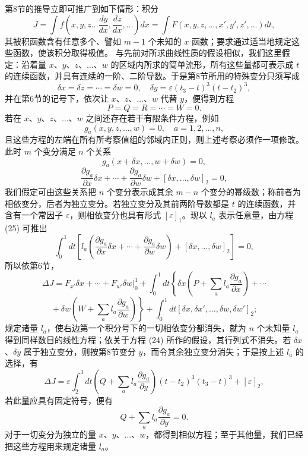 \documentclass[11pt,a4paper,leqno]{article}
\begin{document}
第8节的推导立即可推广到如下情形：积分
\[
J=\int f\left(x,y,z\ldots \frac{dy}{dx},\frac{dz}{dx},\ldots\right)dx=\int F(x,y,z,\ldots,x',y',z',\ldots)dt,
\]
其被积函数含有任意多个、譬如 $m-1$ 个未知的 $x$ 函数；要求通过适当地规定这些函数，使该积分取得极值。
与先前对所求曲线性质的假设相似，我们这里假定：沿着量 $x$、$y$、$z$、$\ldots$、$w$ 的区域内所求的简单流形，所有这些量都可表示成 $t$ 的连续函数，并具有连续的一阶、二阶导数。于是第8节所用的特殊变分只须写成
\[
\delta x=\delta z=\cdots=\delta w=0,\quad \delta y=\varepsilon(t_3-t)^3(t-t_2)^3,
\]
并在第6节的记号下，依次让 $x$、$z$、$\ldots$、$w$ 代替 $y$，便得到方程
\[
P=Q=R=\cdots=W=0.
\]
若在 $x$、$y$、$z$、$\ldots$、$w$ 之间还存在若干有限条件方程，例如
\begin{equation}\tag{24}
g_a(x,y,z,\ldots,w)=0,\quad a=1,2,\ldots,n,
\end{equation}
且这些方程的左端在所有所考察值组的邻域内正则，则上述考察必须作一项修改。此时 $m$ 个变分满足 $n$ 个关系
\[
g_a(x+\delta x,\ldots,w+\delta w)=0,
\]
\begin{equation}\tag{25}
\frac{\partial g_a}{\partial x}\delta x+\cdots+\frac{\partial g_a}{\partial w}\delta w+[\delta x,\ldots,\delta w]_2=0,
\end{equation}
我们假定可由这些关系把 $n$ 个变分表示成其余 $m-n$ 个变分的幂级数；称前者为相依变分，后者为独立变分。若独立变分及其前两阶导数都是 $t$ 的连续函数，并含有一个常因子 $\varepsilon$，则相依变分也具有形式 $[\varepsilon]_1$。现以 $l_a$ 表示任意量，由方程 (25) 可推出
\[
\int_0^1 dt\left[l_a\left(\frac{\partial g_a}{\partial x}\delta x+\cdots+\frac{\partial g_a}{\partial w}\delta w\right)+[\delta x,\ldots,\delta w]_2\right]=0,
\]
所以依第6节，
\[
\Delta J=\left. F_{x'}\delta x+\cdots+F_{w'}\delta w\right|_0^1+\int_0^1dt\left\{\delta x\left(P+\sum_a l_a\frac{\partial g_a}{\partial x}\right)+\cdots
\right.
\]
\[
\left.{}+\delta w\left(W+\sum_a l_a\frac{\partial g_a}{\partial w}\right)\right\}+\int_0^1dt[\delta x,\delta x',\ldots,\delta w,\delta w']_2;
\]
规定诸量 $l_a$，使右边第一个积分号下的一切相依变分都消失，就为 $n$ 个未知量 $l_a$ 得到同样数目的线性方程；依关于方程 (24) 所作的假设，其行列式不消失。若 $\delta x$、$\delta y$ 属于独立变分，则按第8节变分 $y$，而令其余独立变分消失；于是按上述 $l_a$ 的选择，有
\[
\Delta J=\varepsilon\int_2^3 dt\left(Q+\sum_a l_a\frac{\partial g_a}{\partial y}\right)(t-t_2)^3(t_3-t)^3+[\varepsilon]_2,
\]
若此量应具有固定符号，便有
\[
Q+\sum_a l_a\frac{\partial g_a}{\partial y}=0.
\]
对于一切变分为独立的量 $x$、$y$、$\ldots$、$w$，都得到相似方程；至于其他量，我们已经把这些方程用来规定诸量 $l_a$。
\end{document}

